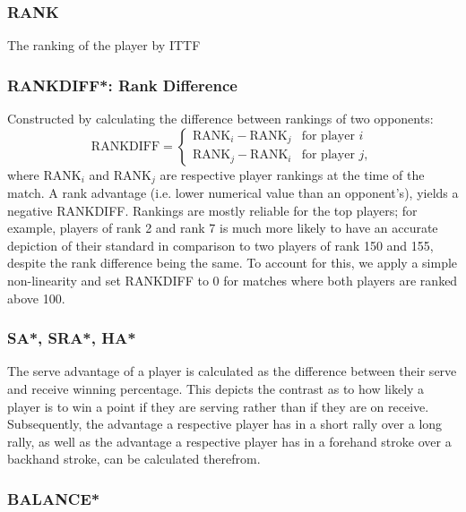 \subsubsection*{RANK} \label{sec:rank}
The ranking of the player by ITTF 

\subsubsection*{RANKDIFF*: Rank Difference} \label{sec:rankdiff}
Constructed by calculating the difference between rankings of two opponents:
\begin{equation}
    \text{RANKDIFF} = \begin{cases}
\text{RANK}_i - \text{RANK}_j &\text{for player $i$} \\
\text{RANK}_j - \text{RANK}_i &\text{for player $j$},
\end{cases}
\end{equation}
where RANK$_i$ and RANK$_j$ are respective player rankings at the time of the match. A rank advantage (i.e. lower numerical value than an opponent's), yields a negative RANKDIFF. Rankings are mostly reliable for the top players; for example, players of rank 2 and rank 7 is much more likely to have an accurate depiction of their standard in comparison to two players of rank 150 and 155, despite the rank difference being the same. To account for this, we apply a simple non-linearity and set RANKDIFF to $0$ for matches where both players are ranked above 100.%


\subsubsection*{SA*, SRA*, HA*} \label{sec:advantage}
The serve advantage of a player is calculated as the difference between their serve and receive winning percentage. This depicts the contrast as to how likely a player is to win a point if they are serving rather than if they are on receive. Subsequently, the advantage a respective player has in a short rally over a long rally, as well as the advantage a respective player has in a forehand stroke over a backhand stroke, can be calculated therefrom.

\subsubsection*{BALANCE*} \label{sec:balance}

